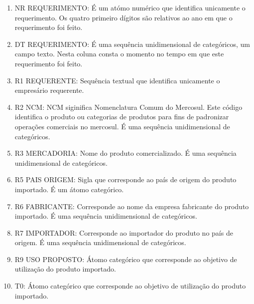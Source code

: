 \begin{enumerate}
\item NR REQUERIMENTO: É um atómo numérico que identifica unicamente o requerimento. Os quatro primeiro dígitos são relativos ao ano em que o requerimento foi feito.
\item DT REQUERIMENTO: É uma sequência unidimensional de categóricos, um campo texto. Nesta coluna consta o momento no tempo em que este requerimento foi feito.
\item  R1 REQUERENTE: Sequência textual que identifica unicamente o empresário requerente.
\item  R2 NCM: NCM siginifica Nomenclatura Comum do Mercosul. Este código identifica o produto ou categorias de produtos para fins de padronizar operações comerciais no mercosul. É uma sequência unidimensional de categóricos.
\item R3 MERCADORIA: Nome do produto comercializado. É uma sequência unidimensional de categóricos.
\item  R5 PAIS ORIGEM: Sigla que corresponde ao país de origem do produto importado. É um átomo categórico.
\item R6 FABRICANTE: Corresponde ao nome da empresa fabricante do produto importado. É uma sequência unidimensional de categóricos.
\item R7 IMPORTADOR: Corresponde ao importador do produto no país de origem. É uma sequência unidimensional de categóricos.
\item R9 USO PROPOSTO: Átomo categórico que corresponde ao objetivo de utilização do produto importado.
\item T0: Átomo categórico que corresponde ao objetivo de utilização do produto importado.
\end{enumerate}



































